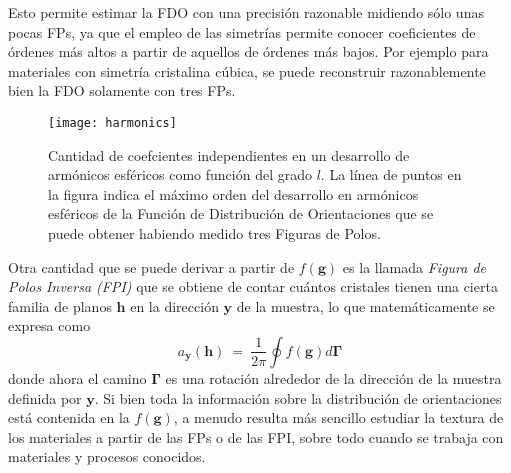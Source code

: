 Esto permite estimar la FDO con una precisión razonable midiendo sólo unas pocas FPs, ya que el empleo de las simetrías permite conocer coeficientes de órdenes más altos a partir de aquellos de órdenes más bajos. 
Por ejemplo para materiales con simetría cristalina cúbica, se puede reconstruir razonablemente bien la FDO solamente con tres FPs.
\begin{figure}[!htb]
  \centering
  \texttt{[image: harmonics]}
  \caption{Cantidad de coefcientes independientes en un desarrollo de armónicos esféricos como función del grado $l$. La línea de puntos en la figura indica el máximo orden del desarrollo en armónicos esféricos de la Función de Distribución de Orientaciones que se puede obtener habiendo medido tres Figuras de Polos.}
  \label{fig:harmonics}
\end{figure}

Otra cantidad que se puede derivar a partir de $f(\mathbf{g})$ es la llamada \textit{Figura de Polos Inversa (FPI)} que se obtiene de contar cuántos cristales tienen una cierta familia de planos $\mathbf{h}$ en la dirección $\mathbf{y}$ de la muestra, lo que matemáticamente se expresa como
\begin{equation}
  a_{\mathbf{y}}(\mathbf{h}) \ = \ \frac{1}{2 \pi} \oint f(\mathbf{g}) d\mathbf{\Gamma}
  \label{eq:IPF}
\end{equation}
\noindent
donde ahora el camino $\mathbf{\Gamma}$ es una rotación alrededor de la dirección de la muestra definida por $\mathbf{y}$.
Si bien toda la información sobre la distribución de orientaciones está contenida en la $f(\mathbf{g})$, a menudo resulta más sencillo estudiar la textura de los materiales a partir de las FPs o de las FPI, sobre todo cuando se trabaja con materiales y procesos conocidos.


